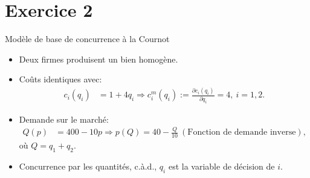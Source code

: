 \section{Exercice 2}
\frame{\sectionpage}
\begin{frame}[allowframebreaks]{Modèle de base de concurrence à la Cournot}
\begin{itemize}
\item Deux firmes produisent un bien homogène. 
\item Coûts identiques avec: 
\begin{align}
    c_i(q_i) &= 1 + 4q_i \Rightarrow c_i^m(q_i):=\frac{\partial c_i(q_i)}{\partial q_i} = 4, \ i=1, 2.
    \label{eq1}
\end{align}
\item Demande sur le marché: 
\begin{align}
Q(p) &= 400 - 10p \Rightarrow p(Q) = 40-\frac{Q}{10} \ (\text{Fonction de demande inverse}),
    \label{eq2}
\end{align}
où $Q=q_1+q_2$.
\item Concurrence par les quantités, c.à.d., $q_i$ est la variable de décision de $i$.
\end{itemize}
\end{frame}

